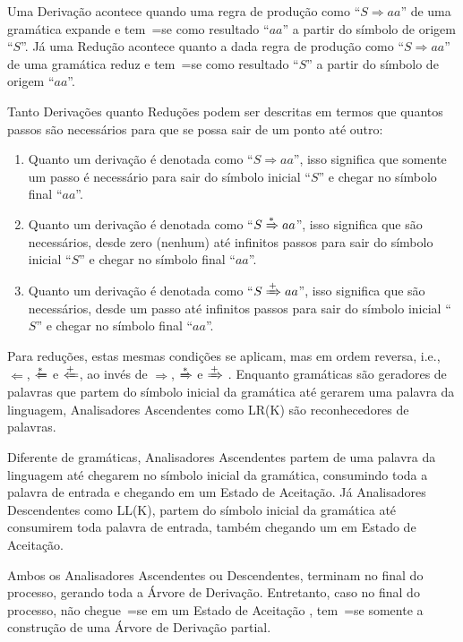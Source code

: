 Uma Derivação acontece quando uma regra de produção como ``$S \Rightarrow a a $'' de uma gramática expande e
tem~=se como resultado ``$a a$'' a partir do símbolo de origem ``$S$''.
Já uma Redução acontece quanto a dada regra de produção como ``$S \Rightarrow a a $'' de uma gramática reduz e
tem~=se como resultado ``$S$'' a partir do símbolo de origem ``$a a$''.

Tanto Derivações quanto Reduções podem ser descritas em termos que quantos passos são necessários para que se possa sair de um ponto até outro:
\begin{enumerate}%
    \item Quanto um derivação é denotada como ``$S \Rightarrow a a $'',
    isso significa que somente um passo é necessário para sair do símbolo inicial ``$S$'' e
    chegar no símbolo final ``$a a$''.
    \item Quanto um derivação é denotada como ``$S \xRightarrow{*} a a $'',
    isso significa que são necessários,
    desde zero (nenhum) até infinitos passos para sair do símbolo inicial ``$S$'' e
    chegar no símbolo final ``$a a$''.
    \item Quanto um derivação é denotada como ``$S \xRightarrow{+} a a $'',
    isso significa que são necessários,
    desde um passo até infinitos passos para sair do símbolo inicial ``$S$'' e
    chegar no símbolo final ``$a a$''.
\end{enumerate}

Para reduções,
estas mesmas condições se aplicam,
mas em ordem reversa,
i.e., $\Leftarrow$, $\xLeftarrow{*}$ e $\xLeftarrow{+}$,
ao invés de $\Rightarrow$,
$\xRightarrow{*}$ e
$\xRightarrow{+}$ \cite{ahoCompilerDragonBook}.
Enquanto gramáticas são geradores de palavras que partem do símbolo inicial da gramática até gerarem uma palavra da linguagem,
Analisadores Ascendentes como LR(K) são reconhecedores de palavras.

Diferente de gramáticas,
Analisadores Ascendentes partem de uma palavra da linguagem até chegarem no símbolo inicial da gramática,
consumindo toda a palavra de entrada e
chegando em um Estado de Aceitação.
Já Analisadores Descendentes como LL(K),
partem do símbolo inicial da gramática até consumirem toda palavra de entrada,
também chegando um em Estado de Aceitação.

Ambos os Analisadores Ascendentes ou
Descendentes,
terminam no final do processo,
gerando toda a Árvore de Derivação.
Entretanto,
caso no final do processo,
não chegue~=se em um Estado de Aceitação \cite{ahoCompilerDragonBook},
tem~=se somente a construção de uma Árvore de Derivação partial.

